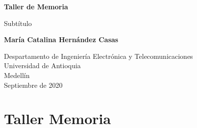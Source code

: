 \documentclass{article}
\begin{document}
\begin{titlepage}
    \begin{center}
        \vspace*{1cm}
            
        \Huge
        \textbf{Taller de Memoria}
            
        \vspace{0.5cm}
        \LARGE
        Subtítulo
            
        \vspace{1.5cm}
            
        \textbf{María Catalina Hernández Casas}
            
        \vfill
            
        \vspace{0.8cm}
            
        \Large
        Despartamento de Ingeniería Electrónica y Telecomunicaciones\\
        Universidad de Antioquia\\
        Medellín\\
        Septiembre de 2020
            
    \end{center}
\end{titlepage}


\section{Taller Memoria}
\end{document}

